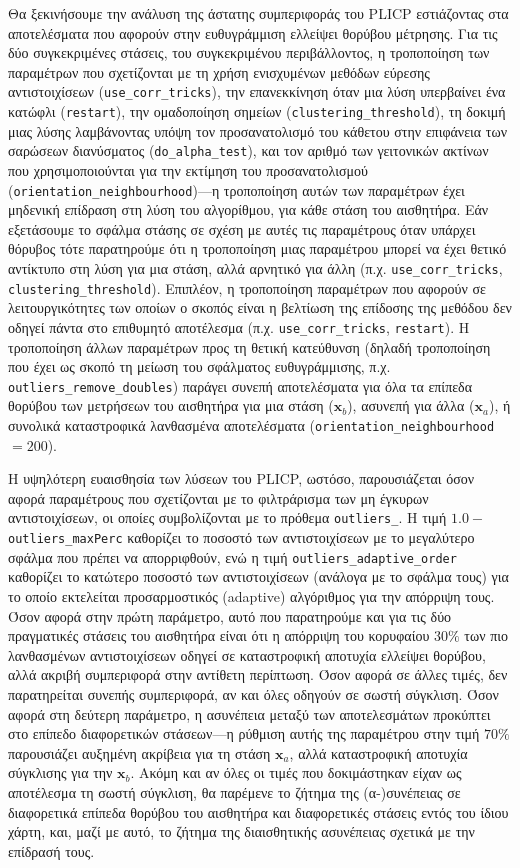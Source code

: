 Θα ξεκινήσουμε την ανάλυση της άστατης συμπεριφοράς του PLICP εστιάζοντας στα
αποτελέσματα που αφορούν στην ευθυγράμμιση ελλείψει θορύβου μέτρησης. Για τις
δύο συγκεκριμένες στάσεις, του συγκεκριμένου περιβάλλοντος, η τροποποίηση των
παραμέτρων που σχετίζονται με τη χρήση ενισχυμένων μεθόδων εύρεσης
αντιστοιχίσεων (\texttt{use\_corr\_tricks}), την επανεκκίνηση όταν μια λύση
υπερβαίνει ένα κατώφλι (\texttt{restart}), την ομαδοποίηση σημείων
(\texttt{clustering\_threshold}), τη δοκιμή μιας λύσης λαμβάνοντας υπόψη τον
προσανατολισμό του κάθετου στην επιφάνεια των σαρώσεων διανύσματος
(\texttt{do\_alpha\_test}), και τον αριθμό των γειτονικών ακτίνων που
χρησιμοποιούνται για την εκτίμηση του προσανατολισμού
(\texttt{orientation\_neighbourhood})---η τροποποίηση αυτών των παραμέτρων
έχει μηδενική επίδραση στη λύση του αλγορίθμου, για κάθε στάση του
αισθητήρα. Εάν εξετάσουμε το σφάλμα στάσης σε σχέση με αυτές τις παραμέτρους
όταν υπάρχει θόρυβος τότε παρατηρούμε ότι η τροποποίηση μιας παραμέτρου μπορεί
να έχει θετικό αντίκτυπο στη λύση για μια στάση, αλλά αρνητικό για άλλη
(π.χ. \texttt{use\_corr\_tricks}, \texttt{clustering\_threshold}). Επιπλέον, η
τροποποίηση παραμέτρων που αφορούν σε λειτουργικότητες των οποίων ο σκοπός
είναι η βελτίωση της επίδοσης της μεθόδου δεν οδηγεί πάντα στο επιθυμητό
αποτέλεσμα (π.χ. \texttt{use\_corr\_tricks}, \texttt{restart}). Η τροποποίηση
άλλων παραμέτρων προς τη θετική κατεύθυνση (δηλαδή τροποποίηση που έχει ως
σκοπό τη μείωση του σφάλματος ευθυγράμμισης, π.χ.
\texttt{outliers\_remove\_doubles}) παράγει συνεπή αποτελέσματα για όλα τα
επίπεδα θορύβου των μετρήσεων του αισθητήρα για μια στάση ($\bm{x}_b$), ασυνεπή
για άλλα ($\bm{x}_a$), ή συνολικά καταστροφικά λανθασμένα αποτελέσματα
(\texttt{orientation\_neighbourhood} $=200$).

Η υψηλότερη ευαισθησία των λύσεων του PLICP, ωστόσο, παρουσιάζεται όσον αφορά
παραμέτρους που σχετίζονται με το φιλτράρισμα των μη έγκυρων αντιστοιχίσεων, οι
οποίες συμβολίζονται με το πρόθεμα \texttt{outliers\_}. Η τιμή
$1.0-$\texttt{outliers\_maxPerc} καθορίζει το ποσοστό των αντιστοιχίσεων με το
μεγαλύτερο σφάλμα που πρέπει να απορριφθούν, ενώ η τιμή
\texttt{outliers\_adaptive\_order} καθορίζει το κατώτερο ποσοστό των
αντιστοιχίσεων (ανάλογα με το σφάλμα τους) για το οποίο εκτελείται
προσαρμοστικός (adaptive) αλγόριθμος για την απόρριψη τους. Όσον αφορά στην
πρώτη παράμετρο, αυτό που παρατηρούμε και για τις δύο πραγματικές στάσεις του
αισθητήρα είναι ότι η απόρριψη του κορυφαίου $30\%$ των πιο λανθασμένων
αντιστοιχίσεων οδηγεί σε καταστροφική αποτυχία ελλείψει θορύβου, αλλά ακριβή
συμπεριφορά στην αντίθετη περίπτωση. Όσον αφορά σε άλλες τιμές, δεν
παρατηρείται συνεπής συμπεριφορά, αν και όλες οδηγούν σε σωστή σύγκλιση. Όσον
αφορά στη δεύτερη παράμετρο, η ασυνέπεια μεταξύ των αποτελεσμάτων προκύπτει στο
επίπεδο διαφορετικών στάσεων---η ρύθμιση αυτής της παραμέτρου στην τιμή $70\%$
παρουσιάζει αυξημένη ακρίβεια για τη στάση $\bm{x}_a$, αλλά καταστροφική
αποτυχία σύγκλισης για την $\bm{x}_b$. Ακόμη και αν όλες οι τιμές που
δοκιμάστηκαν είχαν ως αποτέλεσμα τη σωστή σύγκλιση, θα παρέμενε το ζήτημα της
(α-)συνέπειας σε διαφορετικά επίπεδα θορύβου του αισθητήρα και διαφορετικές
στάσεις εντός του ίδιου χάρτη, και, μαζί με αυτό, το ζήτημα της διαισθητικής
ασυνέπειας σχετικά με την επίδρασή τους.


